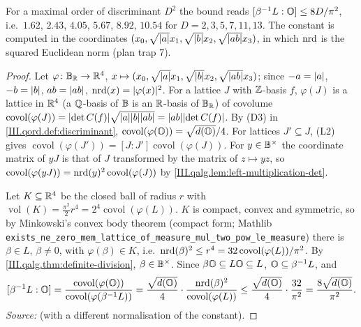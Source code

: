 \begin{theorem}
\end{theorem}
\noindent For a maximal order of discriminant $D^2$ the bound reads $[\beta^{-1}L:\mathbb{O}]\le8D/\pi^2$, i.e.\ $1.62$, $2.43$, $4.05$, $5.67$,
$8.92$, $10.54$ for $D=2,3,5,7,11,13$. The constant is computed in the coordinates $(x_0,\sqrt{\lvert a\rvert}x_1,\sqrt{\lvert b\rvert}x_2,\sqrt{\lvert ab\rvert}x_3)$, in
which $\operatorname{nrd}$ is the squared Euclidean norm (plan trap 7).
\begin{proof}
Let $\varphi\colon\mathbb{B}_{\mathbb{R}}\to\mathbb{R}^4$, $x\mapsto(x_0,\sqrt{\lvert a\rvert}x_1,\sqrt{\lvert b\rvert}x_2,\sqrt{\lvert ab\rvert}x_3)$; since $-a=\lvert a\rvert$, $-b=\lvert b\rvert$, $ab=\lvert ab\rvert$,
$\operatorname{nrd}(x)=\lvert\varphi(x)\rvert^2$. For a lattice $J$ with $\mathbb{Z}$-basis $f$, $\varphi(J)$ is a lattice in $\mathbb{R}^4$ (a $\mathbb{Q}$-basis of $\mathbb{B}$ is an $\mathbb{R}$-basis of
$\mathbb{B}_{\mathbb{R}}$) of covolume $\operatorname{covol}(\varphi(J))=\lvert\det C(f)\rvert\sqrt{\lvert a\rvert\lvert b\rvert\lvert ab\rvert}=\lvert ab\rvert\lvert\det C(f)\rvert$. By (D3) in
\cref{III.qord.def:discriminant}, $\operatorname{covol}(\varphi(\mathbb{O}))=\sqrt{d(\mathbb{O})}/4$. For lattices $J'\subseteq J$, (L2) gives
$\operatorname{covol}(\varphi(J'))=[J:J']\operatorname{covol}(\varphi(J))$. For $y\in\mathbb{B}^\times$ the coordinate matrix of $yJ$ is that of $J$ transformed by
the matrix of $z\mapsto yz$, so $\operatorname{covol}(\varphi(yJ))=\operatorname{nrd}(y)^2\operatorname{covol}(\varphi(J))$ by \cref{III.qalg.lem:left-multiplication-det}.

Let $K\subseteq\mathbb{R}^4$ be the closed ball of radius $r$ with $\operatorname{vol}(K)=\frac{\pi^2}2r^4=2^4\operatorname{covol}(\varphi(L))$. $K$ is compact,
convex and symmetric, so by Minkowski's convex body theorem (compact form; Mathlib
\texttt{exists\_ne\_zero\_mem\_lattice\_of\_measure\_mul\_two\_pow\_le\_measure}) there is $\beta\in L$, $\beta\ne0$, with $\varphi(\beta)\in K$, i.e.\
$\operatorname{nrd}(\beta)^2\le r^4=32\operatorname{covol}(\varphi(L))/\pi^2$. By \cref{III.qalg.thm:definite-division}, $\beta\in\mathbb{B}^\times$. Since $\beta\mathbb{O}\subseteq
L\mathbb{O}\subseteq L$, $\mathbb{O}\subseteq\beta^{-1}L$, and
\[
  [\beta^{-1}L:\mathbb{O}]=\frac{\operatorname{covol}(\varphi(\mathbb{O}))}{\operatorname{covol}(\varphi(\beta^{-1}L))}
  =\frac{\sqrt{d(\mathbb{O})}}4\cdot\frac{\operatorname{nrd}(\beta)^2}{\operatorname{covol}(\varphi(L))}\le\frac{\sqrt{d(\mathbb{O})}}4\cdot\frac{32}{\pi^2}=\frac{8\sqrt{d(\mathbb{O})}}{\pi^2}.
\]
\emph{Source:} \cite[§17.5]{Voi} (with a different normalisation of the constant).
\end{proof}

